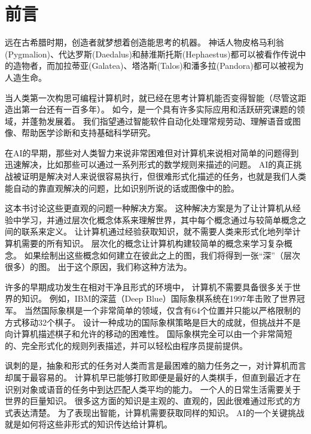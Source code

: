 \chapter{前言}
\label{chap:introduction}
远在古希腊时期，创造者就梦想着创造能思考的机器。
神话人物皮格马利翁(Pygmalion)、代达罗斯(Daedalus)和赫淮斯托斯(Hephaestus)都可以被看作传说中的造物者，而加拉蒂亚(Galatea)、塔洛斯(Talos)和潘多拉(Pandora)都可以被视为人造生命\citep{ovid2004metamorphoses,sparkes1996red,1997works}。

当人类第一次构思可编程计算机时，就已经在思考计算机能否变得智能（尽管这距造出第一台还有一百多年）\citep{Lovelace1842}。
如今，是一个具有许多实际应用和活跃研究课题的领域，并蓬勃发展着。
我们指望通过智能软件自动化处理常规劳动、理解语音或图像、帮助医学诊断和支持基础科学研究。

在\gls{AI}的早期，那些对人类智力来说非常困难但对计算机来说相对简单的问题得到迅速解决，比如那些可以通过一系列形式的数学规则来描述的问题。
\gls{AI}的真正挑战被证明是解决对人来说很容易执行，但很难形式化描述的任务，也就是我们人类能自动的靠直观解决的问题，比如识别所说的话或图像中的脸。

这本书讨论这些更直观的问题一种解决方案。
这种解决方案是为了让计算机从经验中学习，并通过层次化概念体系来理解世界，其中每个概念通过与较简单概念之间的联系来定义。
让计算机通过经验获取知识，就不需要人类来形式化地列举计算机需要的所有知识。
层次化的概念让计算机构建较简单的概念来学习复杂概念。
如果绘制出这些概念如何建立在彼此之上的图，我们将得到一张``深''（层次很多）的图。
出于这个原因，我们称这种方法为。


许多的早期成功发生在相对干净且形式的环境中， 计算机不需要具备很多关于世界的知识。
例如，IBM的深蓝（Deep Blue）国际象棋系统在1997年击败了世界冠军\citep{Hsu2002}。
当然国际象棋是一个非常简单的领域，仅含有64个位置并只能以严格限制的方式移动32个棋子。
设计一种成功的国际象棋策略是巨大的成就，但挑战并不是向计算机描述棋子和允许的移动的困难性。
国际象棋完全可以由一个非常简短的、完全形式化的规则列表描述，并可以轻松由程序员提前提供。

讽刺的是，抽象和形式的任务对人类而言是最困难的脑力任务之一，对计算机而言却属于最容易的。
计算机早已能够打败即便是最好的人类棋手，但直到最近才在识别对象或语音的任务中到达匹配人类平均的能力。
一个人的日常生活需要关于世界的巨量知识。
很多这方面的知识是主观的、直观的，因此很难通过形式的方式表达清楚。
为了表现出智能，计算机需要获取同样的知识。
\gls{AI}的一个关键挑战就是如何将这些非形式的知识传达给计算机。


